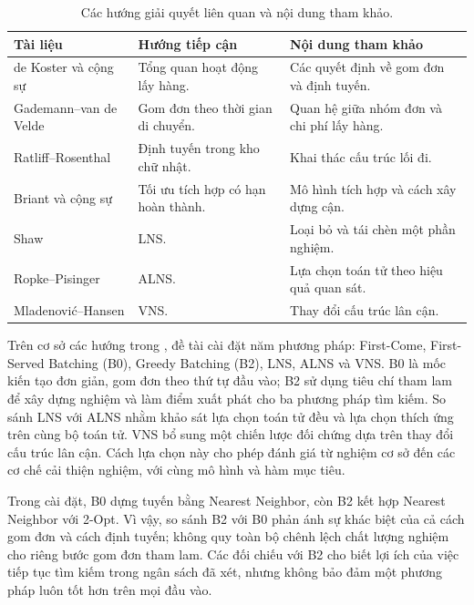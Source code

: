 \begin{table}[H]
\centering\small
\begin{tabularx}{\linewidth}{lXX}
\toprule
Tài liệu & Hướng tiếp cận & Nội dung tham khảo \\
\midrule
de Koster và cộng sự \cite{dekoster2007} & Tổng quan hoạt động lấy hàng. & Các quyết định về gom đơn và định tuyến. \\
Gademann--van de Velde \cite{gademann2005} & Gom đơn theo thời gian di chuyển. & Quan hệ giữa nhóm đơn và chi phí lấy hàng. \\
Ratliff--Rosenthal \cite{ratliff1983} & Định tuyến trong kho chữ nhật. & Khai thác cấu trúc lối đi. \\
Briant và cộng sự \cite{briant2023} & Tối ưu tích hợp có hạn hoàn thành. & Mô hình tích hợp và cách xây dựng cận. \\
Shaw \cite{shaw1998} & LNS. & Loại bỏ và tái chèn một phần nghiệm. \\
Ropke--Pisinger \cite{ropke2006} & ALNS. & Lựa chọn toán tử theo hiệu quả quan sát. \\
Mladenović--Hansen \cite{mladenovic1997} & VNS. & Thay đổi cấu trúc lân cận. \\
\bottomrule
\end{tabularx}
\caption{Các hướng giải quyết liên quan và nội dung tham khảo.}\label{tab:related-work}
\end{table}

Trên cơ sở các hướng trong , đề tài cài đặt năm phương pháp: First-Come, First-Served Batching (B0), Greedy Batching (B2), LNS, ALNS và VNS. B0 là mốc kiến tạo đơn giản, gom đơn theo thứ tự đầu vào; B2 sử dụng tiêu chí tham lam để xây dựng nghiệm và làm điểm xuất phát cho ba phương pháp tìm kiếm. So sánh LNS với ALNS nhằm khảo sát lựa chọn toán tử đều và lựa chọn thích ứng trên cùng bộ toán tử. VNS bổ sung một chiến lược đối chứng dựa trên thay đổi cấu trúc lân cận. Cách lựa chọn này cho phép đánh giá từ nghiệm cơ sở đến các cơ chế cải thiện nghiệm, với cùng mô hình và hàm mục tiêu.

Trong cài đặt, B0 dựng tuyến bằng Nearest Neighbor, còn B2 kết hợp Nearest Neighbor với 2-Opt. Vì vậy, so sánh B2 với B0 phản ánh sự khác biệt của cả cách gom đơn và cách định tuyến; không quy toàn bộ chênh lệch chất lượng nghiệm cho riêng bước gom đơn tham lam. Các đối chiếu với B2 cho biết lợi ích của việc tiếp tục tìm kiếm trong ngân sách đã xét, nhưng không bảo đảm một phương pháp luôn tốt hơn trên mọi đầu vào.

